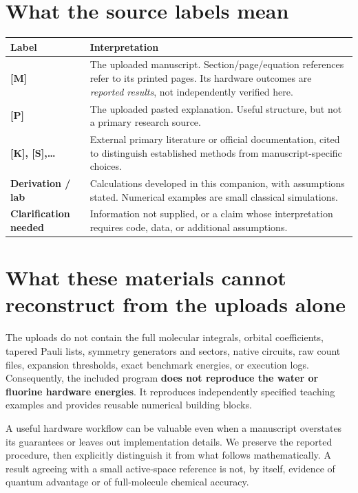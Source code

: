 \documentclass[11pt,a4paper,oneside]{report}
\begin{document}
\section*{What the source labels mean}
\begin{tabularx}{\linewidth}{@{}p{30mm}Y@{}}
\toprule
Label & Interpretation\\\midrule
\textbf{[M]} & The uploaded manuscript. Section/page/equation references refer to its printed pages. Its hardware outcomes are \emph{reported results}, not independently verified here.\\
\textbf{[P]} & The uploaded pasted explanation. Useful structure, but not a primary research source.\\
\textbf{[K], [S],\ldots} & External primary literature or official documentation, cited to distinguish established methods from manuscript-specific choices.\\
\textbf{Derivation / lab} & Calculations developed in this companion, with assumptions stated. Numerical examples are small classical simulations.\\
\textbf{Clarification needed} & Information not supplied, or a claim whose interpretation requires code, data, or additional assumptions.\\\bottomrule
\end{tabularx}

\section*{What these materials cannot reconstruct from the uploads alone}
The uploads do not contain the full molecular integrals, orbital coefficients, tapered Pauli lists, symmetry generators and sectors, native circuits, raw count files, expansion thresholds, exact benchmark energies, or execution logs. Consequently, the included program \textbf{does not reproduce the water or fluorine hardware energies}. It reproduces independently specified teaching examples and provides reusable numerical building blocks.

\begin{caution}
A useful hardware workflow can be valuable even when a manuscript overstates its guarantees or leaves out implementation details. We preserve the reported procedure, then explicitly distinguish it from what follows mathematically. A result agreeing with a small active-space reference is not, by itself, evidence of quantum advantage or of full-molecule chemical accuracy.
\end{caution}
\end{document}
